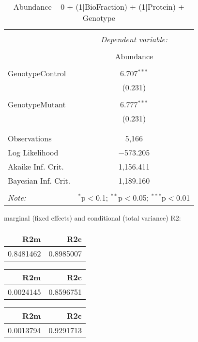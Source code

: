 \documentclass[11pt]{report}
\begin{document}
\begin{table}[!htbp] \centering 
  \caption{Abundance ~ 0 + (1|BioFraction) + (1|Protein) + Genotype} 
  \label{} 
\begin{tabular}{@{\extracolsep{5pt}}lc} 
\\[-1.8ex]\hline 
\hline \\[-1.8ex] 
 & \multicolumn{1}{c}{\textit{Dependent variable:}} \\ 
\cline{2-2} 
\\[-1.8ex] & Abundance \\ 
\hline \\[-1.8ex] 
 GenotypeControl & 6.707$^{***}$ \\ 
  & (0.231) \\ 
  & \\ 
 GenotypeMutant & 6.777$^{***}$ \\ 
  & (0.231) \\ 
  & \\ 
\hline \\[-1.8ex] 
Observations & 5,166 \\ 
Log Likelihood & $-$573.205 \\ 
Akaike Inf. Crit. & 1,156.411 \\ 
Bayesian Inf. Crit. & 1,189.160 \\ 
\hline 
\hline \\[-1.8ex] 
\textit{Note:}  & \multicolumn{1}{r}{$^{*}$p$<$0.1; $^{**}$p$<$0.05; $^{***}$p$<$0.01} \\ 
\end{tabular} 
\end{table} 
marginal (fixed effects) and conditional (total variance) R2:

\begin{tabular}{r|r}
\hline
R2m & R2c\\
\hline
0.8481462 & 0.8985007\\
\hline
\end{tabular}

\begin{tabular}{r|r}
\hline
R2m & R2c\\
\hline
0.0024145 & 0.8596751\\
\hline
\end{tabular}

\begin{tabular}{r|r}
\hline
R2m & R2c\\
\hline
0.0013794 & 0.9291713\\
\hline
\end{tabular}
\end{document}
